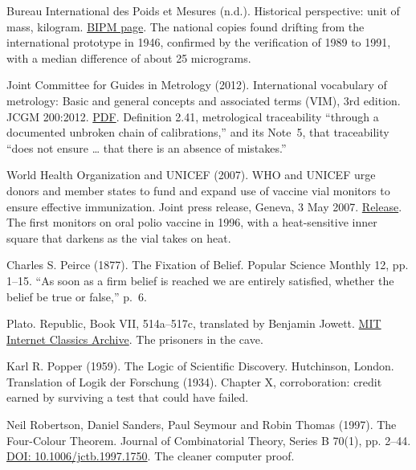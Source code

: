 \noindent Bureau International des Poids et Mesures (n.d.). Historical perspective: unit of mass, kilogram. \href{https://www.bipm.org/en/history-si/kilogram}{BIPM page}. The national copies found drifting from the international prototype in 1946, confirmed by the verification of 1989 to 1991, with a median difference of about 25 micrograms.
\par\medskip

\noindent Joint Committee for Guides in Metrology (2012). International vocabulary of metrology: Basic and general concepts and associated terms (VIM), 3rd edition. JCGM 200:2012. \href{https://www.bipm.org/documents/20126/2071204/JCGM_200_2012.pdf}{PDF}. Definition 2.41, metrological traceability ``through a documented unbroken chain of calibrations,'' and its Note~5, that traceability ``does not ensure \ldots{} that there is an absence of mistakes.''
\par\medskip

\noindent World Health Organization and UNICEF (2007). WHO and UNICEF urge donors and member states to fund and expand use of vaccine vial monitors to ensure effective immunization. Joint press release, Geneva, 3 May 2007. \href{https://www.gavi.org/news/media-room/who-and-unicef-urge-donors-and-member-states-fund-and-expand-use-vaccine-vial}{Release}. The first monitors on oral polio vaccine in 1996, with a heat-sensitive inner square that darkens as the vial takes on heat.
\par\medskip

\noindent Charles S. Peirce (1877). The Fixation of Belief. Popular Science Monthly 12, pp. 1--15. ``As soon as a firm belief is reached we are entirely satisfied, whether the belief be true or false,'' p.~6.
\par\medskip

\noindent Plato. Republic, Book VII, 514a--517c, translated by Benjamin Jowett. \href{https://classics.mit.edu/Plato/republic.8.vii.html}{MIT Internet Classics Archive}. The prisoners in the cave.
\par\medskip

\noindent Karl R. Popper (1959). The Logic of Scientific Discovery. Hutchinson, London. Translation of Logik der Forschung (1934). Chapter X, corroboration: credit earned by surviving a test that could have failed.
\par\medskip

\noindent Neil Robertson, Daniel Sanders, Paul Seymour and Robin Thomas (1997). The Four-Colour Theorem. Journal of Combinatorial Theory, Series B 70(1), pp. 2--44. \href{https://doi.org/10.1006/jctb.1997.1750}{DOI: 10.1006/jctb.1997.1750}. The cleaner computer proof.
\par\medskip

